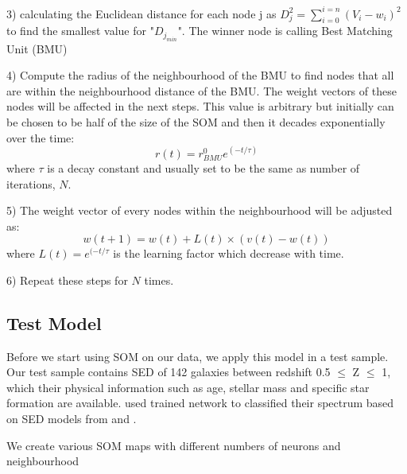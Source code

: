   3) calculating the Euclidean distance for each node j as  $D_j^2= \sum_{i=0}^{i=n} (V_i - w_i)^2 $ to find the smallest value for "$D_{j_{min}}$". The winner node is calling Best Matching Unit (BMU)
  
  4) Compute the radius of the neighbourhood of the BMU to find nodes that all are within the neighbourhood distance of the BMU. The weight vectors of these nodes will be affected in the next steps. This value is arbitrary but initially can be chosen to be half of the size of the SOM and then it decades exponentially over the time:
   \begin{equation}
   r(t) = r^0_{BMU}e^{(-t/\tau)}
   \end{equation}
   where $\tau$ is a decay constant and usually set to be the same as number of iterations, $N$.
   
   5) The weight vector of every nodes within the neighbourhood will be adjusted as:
   \begin{equation}
   w(t+1)=w(t)+L(t) \times(v(t)-w(t))
   \end{equation}
   where $L(t) = e^{(-t/\tau}$ is the learning factor which decrease with time.
   
   6) Repeat these steps for $N$ times.
   
   
   
 \subsection{Test Model}
 Before we start using SOM on our data, we apply this model in a test sample. Our test sample contains SED of 142 galaxies between redshift 0.5 $ \leq$ Z $\leq $ 1, which their physical information such as age, stellar mass and specific star formation are available. \cite{Hossein12} used trained network to classified their spectrum based on SED models from \cite{Kinney96} and \cite{Coleman80}. 
 
 We create various SOM maps with different numbers of neurons and neighbourhood 
